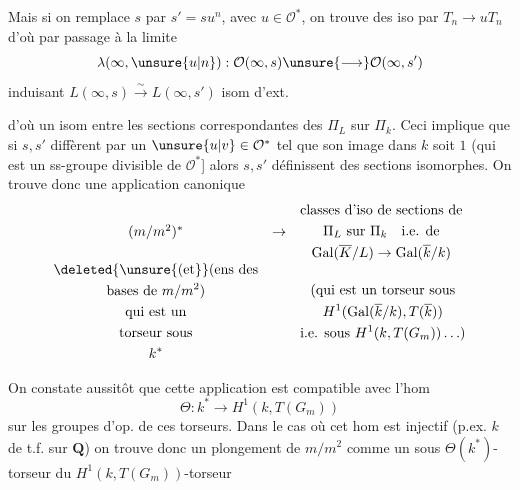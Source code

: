 Mais si on remplace $s$ par $s'=su^n$, avec $u\in\mathcal{O}^*$, on trouve des iso
par $T_n\to uT_n$
d'où par passage à la limite
\[
\lambda(\infty,\unsure{u|n}):\mathcal{O}(\infty,s)\unsure{\longrightarrow}\mathcal{O}(\infty,s')
\]
induisant $L(\infty,s)\xrightarrow{\sim}L(\infty,s')$ isom d'ext. 



d'où un isom entre les sections correspondantes des $\Pi_{L}$ sur $\Pi_k$.
Ceci implique que si $s,s'$ diffèrent par un $\unsure{u|v}\in\mathcal{O}^*$ tel que son image dans $k$ soit $1$   (qui est un ss-groupe divisible de $\mathcal{O}^*$] alors $s,s'$ définissent des sections isomorphes.
On trouve donc une application canonique
\[
\begin{array}{ccl}
(m/m^2)^* & \to &
\begin{gathered}
\text{classes d'iso de sections de}\\
\Pi_L\text{ sur }\Pi_k\quad\text{i.e. de}\\
\operatorname{Gal}(\overline{K}/L)\to\operatorname{Gal}(\overline{k}/k)
\end{gathered}
\\[1ex]
\begin{gathered}
\deleted{\unsure{\text{(et}}}\text{(ens des}\\
\text{bases de }m/m^2\text{)}\\
\text{qui est un}\\
\text{torseur sous}\\ k^*
\end{gathered}
&&
\begin{gathered}
\text{(qui est un torseur sous}\\
H^1(\operatorname{Gal}(\overline{k}/k),T(\overline{k}))\\
\text{i.e. sous }H^1(k,T(G_m))\ldots)
\end{gathered}
\end{array}
\]

On constate aussitôt que cette application est compatible avec l'hom
\[
\Theta:k^*\to H^1(k,T(G_m))
\]
sur les groupes d'op. de ces torseurs.
Dans le cas où cet hom est injectif (p.ex. $k$  de t.f. sur $\mathbf{Q}$) on trouve donc un plongement de $m/m^2$ comme un sous $\Theta(k^*)$-torseur du $H^1(k,T(G_m))$-torseur

